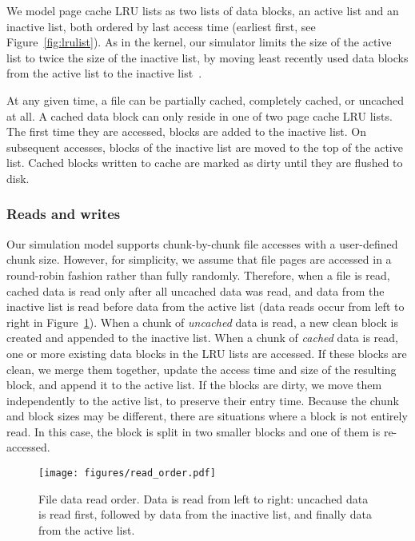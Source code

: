 \documentclass[conference]{IEEEtran}
\begin{document}
    We model page cache LRU lists as 
    two lists of data blocks, an active list and an inactive list, both ordered by 
    last access time (earliest first, see Figure~\ref{fig:lrulist}).
    As in the kernel, our simulator limits the size of the active list to
    twice the size of the inactive list, by moving least recently 
    used data blocks from the active list to the inactive list~\cite{gorman2004understanding, linuxdev3rd2010}.

    At any given time, a file can be partially cached, completely cached,
    or uncached at all. A cached data block can only reside in one of two 
    page cache LRU lists. The first time they are accessed, blocks are
    added to the inactive list. On subsequent accesses, blocks of the
    inactive list are moved to the top of the active list. Cached blocks 
    written to cache are marked as dirty until they are flushed to disk.

    \subsubsection{Reads and writes}

    Our simulation model supports chunk-by-chunk file accesses
    with a user-defined chunk size. However, for simplicity, we assume that file pages are 
    accessed in a round-robin fashion rather than fully randomly. 
    Therefore, when a file is read, cached data is read only after all uncached data was read, and data from the inactive list is read
    before data from the active list
    (data reads occur from left to right in Figure~\ref{fig:read_order}).
    When a chunk of \emph{uncached} data is read, a new clean block is created 
    and appended to the inactive list. 
    When a chunk of \emph{cached} data is read, one or more existing data blocks in the LRU lists are accessed.
    If these blocks are clean, we merge them together, update the access time and size of the resulting block, 
    and append it to the active list. 
    If the blocks are dirty, we move them independently to the active list, to preserve their entry time. 
    Because the chunk and block sizes may be different, there are situations
    where a block is not entirely read. 
    In this case, the block is split in two smaller blocks and one of them is re-accessed.
    \begin{figure}
           \centering
           \texttt{[image: figures/read\_order.pdf]}
           \caption{File data read order. Data is read from left to right: uncached data 
           is read first, followed by data from the inactive list, and finally data from the active list. }
           \label{fig:read_order}
    \end{figure}    
\end{document}
